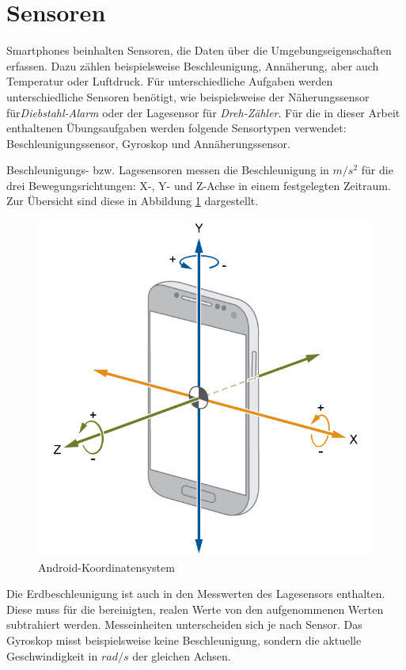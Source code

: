 \documentclass[11pt,a4paper]{report}
\begin{document}
\section{Sensoren}
Smartphones beinhalten Sensoren, die Daten über die Umgebungseigenschaften erfassen.
Dazu zählen beispielsweise Beschleunigung, Annäherung, aber auch Temperatur oder Luftdruck.
Für unterschiedliche Aufgaben werden unterschiedliche Sensoren benötigt, wie beispielsweise der Näherungssensor für\textit{Diebstahl-Alarm} oder der Lagesensor für \textit{Dreh-Zähler}.
Für die in dieser Arbeit enthaltenen Übungsaufgaben werden folgende Sensortypen verwendet: Beschleunigungssensor, Gyroskop und Annäherungssensor.

Beschleunigungs- bzw. Lagesensoren messen die Beschleunigung in $m/s^2$ für die drei Bewegungsrichtungen: X-, Y- und Z-Achse in einem festgelegten Zeitraum.
Zur Übersicht sind diese in Abbildung \ref{fig:and_axes} dargestellt.
\begin{figure}[htbp]
  \centering
  \includegraphics[width=.7\textwidth]{images/android_axes.png}
  \caption{Android-Koordinatensystem}
  \label{fig:and_axes}
\end{figure}
Die Erdbeschleunigung ist auch in den Messwerten des Lagesensors enthalten.
Diese muss für die bereinigten, realen Werte von den aufgenommenen Werten subtrahiert werden\cite{accel_g}.
Messeinheiten unterscheiden sich je nach Sensor.
Das Gyroskop misst beispielsweise keine Beschleunigung, sondern die aktuelle Geschwindigkeit in $rad/s$ der gleichen Achsen.
\end{document}
